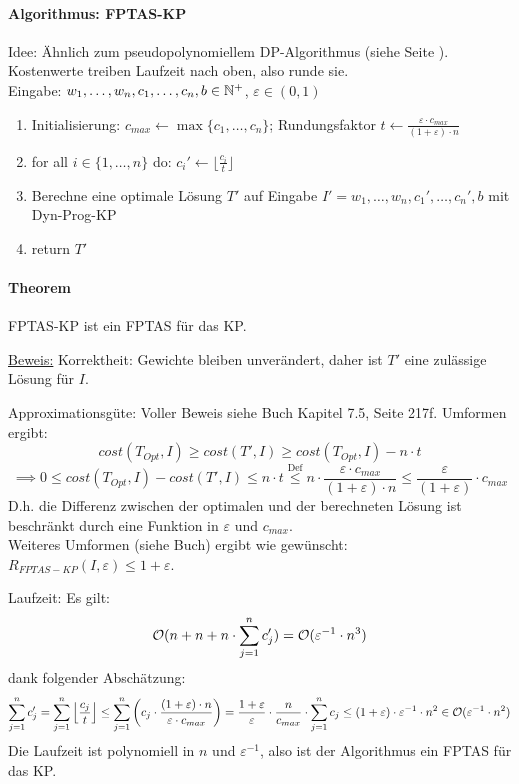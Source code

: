 \paragraph{Algorithmus: FPTAS-KP}
Idee: Ähnlich zum pseudopolynomiellem DP-Algorithmus (siehe Seite \pageref{algo-kp}).
Kostenwerte treiben Laufzeit nach oben, also runde sie.
\\
Eingabe: $w_1, \dots, w_n, c_1, \dots, c_n, b \in \mathbb{N}^+$, $\varepsilon \in (0,1)$
\begin{enumerate}
    \item Initialisierung: $c_{max} \leftarrow \max \{c_1, \dots, c_n\}$;
    Rundungsfaktor $t \leftarrow \frac{\varepsilon \cdot c_{max}}{(1+\varepsilon) \cdot n}$
    \item for all $i \in \{1, \dots, n\}$ do: $c_i' \leftarrow \lfloor \frac{c_i}{t} \rfloor$
    \item Berechne eine optimale Lösung $T'$ auf Eingabe $I' = w_1, \dots, w_n, c_1', \dots, c_n', b$ mit Dyn-Prog-KP
    \item return $T'$
\end{enumerate}

\paragraph{Theorem}
FPTAS-KP ist ein FPTAS für das KP.

\underline{Beweis:}
Korrektheit: Gewichte bleiben unverändert, daher ist $T'$ eine zulässige Lösung für $I$.

Approximationsgüte:
Voller Beweis siehe Buch Kapitel 7.5, Seite 217f.
Umformen ergibt:
$$ cost(T_{Opt}, I) \geq  cost(T', I) \geq cost(T_{Opt}, I) - n \cdot t $$
$$
\implies 0 \leq cost(T_{Opt}, I) - cost(T', I) \leq n \cdot t
\overset{\text{Def}}{\leq} n \cdot \frac{\varepsilon \cdot c_{max}}{(1+\varepsilon) \cdot n}
\leq \frac{\varepsilon}{(1+\varepsilon)} \cdot c_{max}
$$
D.h. die Differenz zwischen der optimalen und der berechneten Lösung ist beschränkt durch eine Funktion
in $\varepsilon$ und $c_{max}$.
\\
Weiteres Umformen (siehe Buch) ergibt wie gewünscht: $R_{FPTAS-KP}(I, \varepsilon) \leq 1 + \varepsilon$.

Laufzeit: Es gilt:
$$ \mathcal{O}(n + n + n \cdot \sum_{j=1}^n c_j') = \mathcal{O}(\varepsilon^{-1} \cdot n^3) $$
dank folgender Abschätzung:
\begin{align*}
\sum_{j=1}^n c_j'
= \sum_{j=1}^n \left\lfloor \frac{c_j}{t} \right\rfloor
\leq \sum_{j=1}^n \left( c_j \cdot \frac{(1+\varepsilon) \cdot n}{\varepsilon \cdot c_{max}} \right)
= \frac{1+\varepsilon}{\varepsilon} \cdot \frac{n}{c_{max}} \cdot \sum_{j=1}^n c_j
\leq (1+\varepsilon) \cdot \varepsilon^{-1} \cdot n^2
\in \mathcal{O}(\varepsilon^{-1} \cdot n^2)
\end{align*}
Die Laufzeit ist polynomiell in $n$ und $\varepsilon^{-1}$, also ist der Algorithmus ein FPTAS für das KP.
